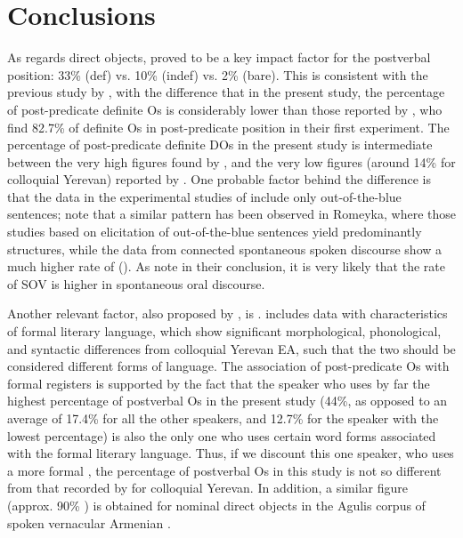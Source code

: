 \documentclass[output=paper,colorlinks,citecolor=brown,draftmode]{langscibook}
\begin{document}
\section{Conclusions}\label{Armenian:ss:4}

As regards direct objects,  proved to be a key impact factor for the postverbal position: 33\% (def) vs. 10\% (indef) vs. 2\% (bare). This is consistent with the previous study by \citet{samvelian_persistence_2023}, with the difference that in the present study, the percentage of post-predicate definite Os is considerably lower than those reported by \citet{samvelian_persistence_2023}, who find 82.7\% of definite Os in post-predicate position in their first experiment. The percentage of post-predicate definite DOs in the present study is intermediate between the very high figures found by \citet{samvelian_persistence_2023}, and the very low figures (around 14\% for colloquial Yerevan) reported by \citet{stilo_preverbal_2018}. One probable factor behind the difference is that the data in the experimental studies of \citet{samvelian_persistence_2023} include only out-of-the-blue sentences; note that a similar pattern has been observed in Romeyka, where those studies based on elicitation of out-of-the-blue sentences yield predominantly  structures, while the data from connected spontaneous spoken discourse show a much higher rate of  (). As \citet{samvelian_persistence_2023} note in their conclusion, it is very likely that the rate of SOV is higher in spontaneous oral discourse.

Another relevant factor, also proposed by \citet{samvelian_persistence_2023}, is . \citet{samvelian_persistence_2023} includes data with characteristics of formal literary language, which show significant morphological, phonological, and syntactic differences from colloquial Yerevan EA, such that the two should be considered different forms of language.  The association of post-predicate Os with formal registers is supported by the fact that the speaker who uses by far the highest percentage of postverbal Os in the present study (44\%, as opposed to an average of 17.4\% for all the other speakers, and 12.7\% for the speaker with the lowest percentage) is also the only one who uses certain word forms associated with the formal literary language. Thus, if we discount this one speaker, who uses a more formal , the percentage of postverbal Os in this study is not so different from that recorded by \citet{stilo_preverbal_2018} for colloquial Yerevan. In addition, a similar figure (approx. 90\% ) is obtained for nominal direct objects in the Agulis corpus of spoken vernacular Armenian \citep{hodgson_armenian_nodate}.
\end{document}
